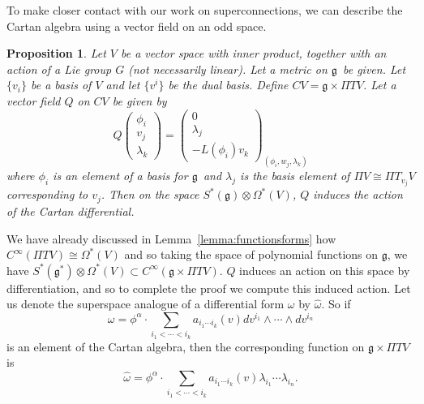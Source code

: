 \documentclass[twoside]{amsart}
\newtheorem{prop}{Proposition}
\newcommand{\lemmaref}[1]{Lemma~\ref{lemma:#1}}
\newcommand{\enm}[1]{\ensuremath{#1}}
\newcommand{\g}{\enm{\mathfrak{g}}}
\newcommand{\formsij}[2]{\ensuremath{\Omega^{#1}({#2})}}
\begin{document}
To make closer contact with our work on superconnections, we can
describe the Cartan algebra using a vector field on an odd space.
\begin{prop}
    Let \( V \) be a vector space with inner product, together with an
    action of a Lie group \( G \) (not necessarily linear).  Let a
    metric on \g\ be given.  Let \( \{v_{i}\} \) be a basis of \( V \)
    and let \( \{v^{i}\} \) be the dual basis.  Define \( CV
     = \g\times\Pi TV \). Let a vector field \(
    Q \) on \( CV\) be given by
    \[ Q\left(
    \begin{array}{c}
	\phi_{i} \\
	v_{j} \\
	\lambda_{k}
    \end{array}
    \right) = \left(
    \begin{array}{c}
	0 \\
	\lambda_{j} \\
	-L(\phi_{i})v_{k}
    \end{array}
    \right)_{(\phi_{i}, w_{j}, \lambda_{k})}
    \]
    where \( \phi_{i} \) is an element of a basis for \g\ and \(
    \lambda_{j} \) is the basis element of \( \Pi V\cong \Pi
T_{v_{j}}V
    \) corresponding to \( v_{j} \).  Then on the space
\(S^*(\g)\otimes
    \formsij{*}{V}\), \( Q \) induces the
    action of the Cartan differential.
    \label{prop:qinducescartan}
\end{prop}
\proof We have already discussed in \lemmaref{functionsforms} how \(
C^{\infty}(\Pi TV)\cong \formsij{*}{V} \) and so taking the
space of polynomial functions on \g, we have \(
S^{*}(\g^{*})\otimes \formsij{*}{V}\subset C^{\infty}(\g\times\Pi
TV).  \)  \( Q \) induces an action on this space by differentiation,
and so to complete the proof we compute this induced action.  Let us
denote the superspace analogue of a differential form \( \omega \) by
\(
\hat{\omega} \).  So if
\[ \omega = \phi^{\alpha}\cdot
\sum_{i_{1}<\cdots<i_{k}}a_{i_{1}\cdots i_{k}}(v)
dv^{i_{1}}\wedge\cdots\wedge dv^{i_{n}} \]
is an element of the Cartan algebra, then the corresponding function
on \( \g\times\Pi TV \) is
\[ \hat{\omega} = \phi^{\alpha}\cdot
\sum_{i_{1}<\cdots<i_{k}}a_{i_{1}\cdots i_{k}}(v)
\lambda_{i_{1}}\cdots \lambda_{i_{n}}. \]
\end{document}
